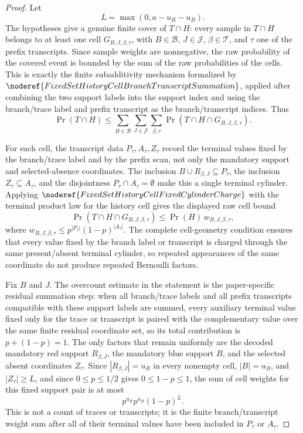 \begin{proof}
Let
\[
L=\max(0,a-u_R-u_B).
\]
The hypotheses give a genuine finite cover of \(T\cap H\): every sample in
\(T\cap H\) belongs to at least one cell \(G_{B,J,\beta,\tau}\), with
\(B\in\mathcal B\), \(J\in\mathcal J\), \(\beta\in\mathcal T\), and
\(\tau\) one of the prefix transcripts.  Since sample weights are
nonnegative, the raw probability of the covered event is bounded by the sum
of the raw probabilities of the cells.  This is exactly the finite
subadditivity mechanism formalized by
\(\noderef{FixedSetHistoryCellBranchTranscriptSummation}\), applied after
combining the two support labels into the support index and using the
branch/trace label and prefix transcript as the branch/transcript indices.
Thus
\[
\Pr(T\cap H)\le
\sum_{B\in\mathcal B}\sum_{J\in\mathcal J}
\sum_{\beta,\tau}
\Pr(T\cap H\cap G_{B,J,\beta,\tau}).
\]

For each cell, the transcript data \(P_\tau,A_\tau,Z_\tau\) record the
terminal values fixed by the branch/trace label and by the prefix scan, not
only the mandatory support and selected-absence coordinates.  The inclusion
\(B\cup R_{\beta,J}\subseteq P_\tau\), the inclusion \(Z_\tau\subseteq A_\tau\), and
the disjointness \(P_\tau\cap A_\tau=\emptyset\) make this a single terminal
cylinder.  Applying \(\noderef{FixedSetHistoryCellFixedCylinderCharge}\) with
the terminal product law for the history cell gives the displayed raw cell
bound
\[
\Pr(T\cap H\cap G_{B,J,\beta,\tau})
\le
\Pr(H)\,w_{B,J,\beta,\tau},
\]
where \(w_{B,J,\beta,\tau}\le p^{|P_\tau|}(1-p)^{|A_\tau|}\).  The complete
cell-geometry condition ensures that every value fixed by the branch label
or transcript is charged through the same present/absent terminal cylinder,
so repeated appearances of the same coordinate do not produce repeated
Bernoulli factors.

Fix \(B\) and \(J\).  The overcount estimate in the statement is the
paper-specific residual summation step: when all branch/trace labels and all
prefix transcripts compatible with these support labels are summed, every
auxiliary terminal value fixed only for the trace or transcript is paired
with the complementary value over the same finite residual coordinate set, so
its total contribution is \(p+(1-p)=1\).  The only factors that remain
uniformly are the decoded mandatory red support \(R_{\beta,J}\), the
mandatory blue support \(B\), and the selected absent coordinates
\(Z_\tau\).  Since \(|R_{\beta,J}|=u_R\) in every nonempty cell,
\(|B|=u_B\), and \(|Z_\tau|\ge L\), and since \(0\le p\le1/2\) gives
\(0\le1-p\le1\), the sum of cell weights for this fixed support pair is at
most
\[
p^{u_R}p^{u_B}(1-p)^L .
\]
This is not a count of traces or transcripts; it is the finite
branch/transcript weight sum after all of their terminal values have been
included in \(P_\tau\) or \(A_\tau\).


\end{proof}
